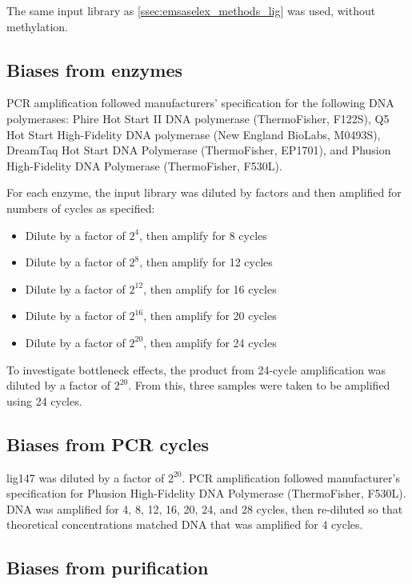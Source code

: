 \documentclass[parskip=full, numbers=noenddot]{scrreprt}
\begin{document}
The same input library as \ref{ssec:emsaselex_methods_lig} was used, without methylation.

\subsection{Biases from enzymes}
\label{ssec:pcrbias_methods_enz}

PCR amplification followed manufacturers' specification for the following DNA polymerases: Phire Hot Start II DNA polymerase (ThermoFisher, F122S), Q5 Hot Start High-Fidelity DNA polymerase (New England BioLabs, M0493S), DreamTaq Hot Start DNA Polymerase (ThermoFisher, EP1701), and Phusion High-Fidelity DNA Polymerase (ThermoFisher, F530L).

For each enzyme, the input library was diluted by factors and then amplified for numbers of cycles as specified:

\begin{itemize}
  \item Dilute by a factor of $2^{4}$, then amplify for 8 cycles
  \item Dilute by a factor of $2^{8}$, then amplify for 12 cycles
  \item Dilute by a factor of $2^{12}$, then amplify for 16 cycles
  \item Dilute by a factor of $2^{16}$, then amplify for 20 cycles
  \item Dilute by a factor of $2^{20}$, then amplify for 24 cycles
\end{itemize}
    
To investigate bottleneck effects, the product from 24-cycle amplification was diluted by a factor of $2^{20}$.  From this, three samples were taken to be amplified using 24 cycles.

\subsection{Biases from PCR cycles}
\label{ssec:pcrbias_methods_pcr}

lig147 was diluted by a factor of $2^{20}$.  PCR amplification followed manufacturer's specification for Phusion High-Fidelity DNA Polymerase (ThermoFisher, F530L).  DNA was amplified for 4, 8, 12, 16, 20, 24, and 28 cycles, then re-diluted so that theoretical concentrations matched DNA that was amplified for 4 cycles.

\subsection{Biases from purification}
\label{ssec:pcrbias_methods_pur}
\end{document}
